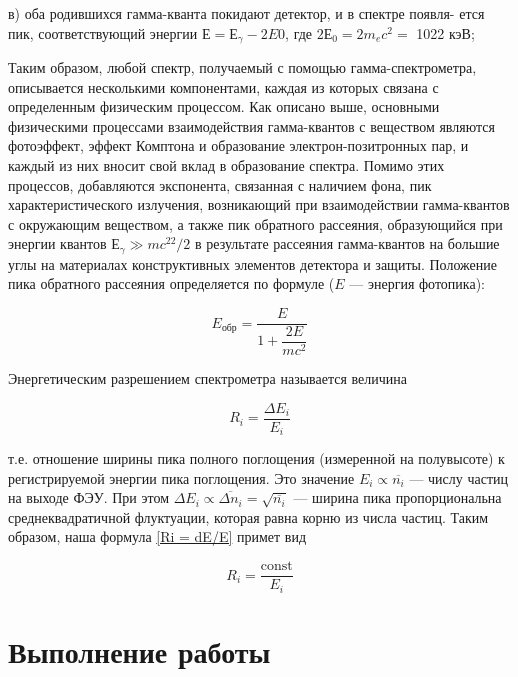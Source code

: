 \documentclass[12pt]{kiarticle}
\begin{document}
	в) оба родившихся гамма-кванта покидают детектор, и в спектре появля- ется пик, соответствующий энергии $  Е = Е_\gamma - 2E0 $, где $ 2Е_0 = 2m_ec^2 = $ 1022 кэВ;
	
	Таким образом, любой спектр, получаемый с помощью гамма-спектрометра, описывается несколькими компонентами, каждая из которых связана с определенным физическим процессом. Как описано выше, основными физическими процессами взаимодействия гамма-квантов с веществом являются фотоэффект, эффект Комптона и образование электрон-позитронных пар, и каждый из них вносит свой вклад в образование спектра. Помимо этих процессов, добавляются экспонента, связанная с наличием фона, пик характеристического излучения, возникающий при взаимодействии гамма-квантов с окружающим веществом, а также пик обратного рассеяния, образующийся при энергии квантов $ Е_\gamma \gg mc^22/2 $ в результате рассеяния гамма-квантов на большие углы на материалах конструктивных элементов детектора и защиты. Положение пика обратного рассеяния определяется по формуле ($ E $ --- энергия фотопика):
	
	\begin{equation}\label{Eobr}
		E_{обр} = \dfrac{E}{1 + \dfrac{2E}{mc^2}}
	\end{equation}

%	
	Энергетическим разрешением спектрометра называется величина
	
	\begin{equation}\label{Ri = dE/E}
	R_i = \dfrac{\Delta E_i}{E_i}
	\end{equation}
	
	т.е. отношение ширины пика полного поглощения (измеренной на полувысоте) к регистрируемой энергии пика поглощения. Это значение $ E_i \propto \overline{n_i} $ --- числу частиц на выходе ФЭУ. При этом  $ \Delta E_i \propto \overline{\Delta n_i} = \sqrt{\overline{n_i}} $ --- ширина пика пропорциональна среднеквадратичной флуктуации, которая равна корню из числа частиц. Таким образом, наша формула \eqref{Ri = dE/E} примет вид
	
	\begin{equation}\label{Ri = c/E}
	R_i = \dfrac{\mathrm{const}}{E_i}
	\end{equation}
	
	\section{Выполнение работы}
	
\end{document}
